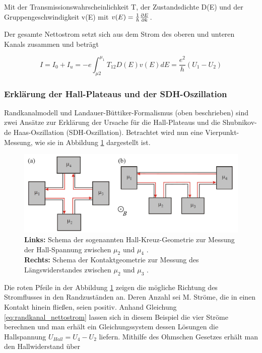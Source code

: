 Mit der Transmissionswahrscheinlichkeit T, der Zustandsdichte D(E)
und der Gruppengeschwindigkeit v(E) mit $v(E)=\frac{1}{\hbar}\frac{\partial E}{\partial k}$.

Der gesamte Nettostrom setzt sich aus dem Strom des oberen und unteren Kanals zusammen und beträgt

\begin{equation}
I=I_0+I_u=-e\int^{\mu_1}_{\mu2}T_{12}D(E)v(E)dE=\frac{e^2}{h}(U_1-U_2)
\label{eq:randkanal_nettostrom}
\end{equation}
 

\subsubsection{Erklärung der Hall-Plateaus und der SDH-Oszillation}

Randkanalmodell und Landauer-Büttiker-Formalismus (oben beschrieben) sind zwei Ansätze zur Erklärung der Ursache für die Hall-Plateaus und die Shubnikov-de Haas-Oszillation (SDH-Oszillation). 
Betrachtet wird nun eine Vierpunkt-Messung, wie sie in Abbildung \ref{fig:Vierpunktmessung_Anleitungsheft} dargestellt ist. 

\begin{figure}[h]
\centering
	\includegraphics[width=0.7\linewidth]{images/Anleitungsheft/Vierpunktmessung_Anleitungsheft.png}
	\caption[Vierpunkt-Messung]{
		\textbf{Links:} Schema der sogenannten Hall-Kreuz-Geometrie zur Messung der Hall-Spannung zwischen $\mu_2$ und $\mu_4$ \cite{anleitung}.\\
		\textbf{Rechts:} Schema der Kontaktgeometrie zur Messung des Längswiderstandes zwischen $\mu_2$ und $\mu_3$ \cite{anleitung}.}
	\label{fig:Vierpunktmessung_Anleitungsheft}
\end{figure}

Die roten Pfeile in der Abbildung \ref{fig:Vierpunktmessung_Anleitungsheft} zeigen die mögliche Richtung des Stromflusses in den Randzuständen an. Deren Anzahl sei M. Ströme, die in einen Kontakt hinein fließen, seien positiv. 
Anhand Gleichung \ref{eq:randkanal_nettostrom} lassen sich in diesem Beispiel die vier Ströme berechnen und man erhält ein Gleichungssystem dessen Lösungen die Hallspannung $U_{Hall}=U_4-U_2$ liefern. 
Mithilfe des Ohmschen Gesetzes erhält man den Hallwiderstand über

